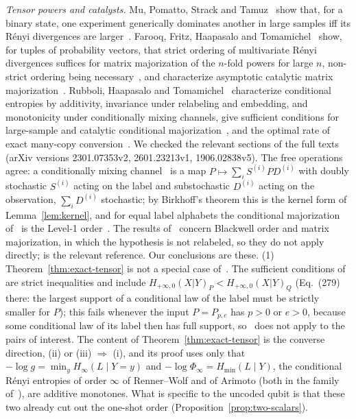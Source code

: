 \emph{Tensor powers and catalysts.} Mu, Pomatto, Strack and Tamuz~\cite{MPST} show that, for a binary state, one experiment generically dominates another in large samples iff its R\'enyi divergences are larger~\cite[Thm.~1]{MPST}. Farooq, Fritz, Haapasalo and Tomamichel~\cite{FFHT} show, for tuples of probability vectors, that strict ordering of multivariate R\'enyi divergences suffices for matrix majorization of the $n$-fold powers for large $n$, non-strict ordering being necessary~\cite[Thm.~19]{FFHT}, and characterize asymptotic catalytic matrix majorization~\cite[Thm.~22]{FFHT}. Rubboli, Haapasalo and Tomamichel~\cite{RHT} characterize conditional entropies by additivity, invariance under relabeling and embedding, and monotonicity under conditionally mixing channels, give sufficient conditions for large-sample and catalytic conditional majorization~\cite[Thm.~6.3]{RHT}, and the optimal rate of exact many-copy conversion~\cite[Thm.~8.1]{RHT}.
We checked the relevant sections of the full texts (arXiv versions 2301.07353v2, 2601.23213v1, 1906.02838v5). The free operations agree: a conditionally mixing channel~\cite[Def.~2.7]{RHT} is a map $P\mapsto\sum_iS^{(i)}PD^{(i)}$ with doubly stochastic $S^{(i)}$ acting on the label and substochastic $D^{(i)}$ acting on the observation, $\sum_iD^{(i)}$ stochastic; by Birkhoff's theorem this is the kernel form of Lemma~\ref{lem:kernel}, and for equal label alphabets the conditional majorization of~\cite[Def.~2.9]{RHT} is the Level-1 order~\cite[Remark~2.10]{RHT}. The results of~\cite{MPST,FFHT} concern Blackwell order and matrix majorization, in which the hypothesis is not relabeled, so they do not apply directly; \cite{RHT} is the relevant reference. Our conclusions are these.
(1) Theorem~\ref{thm:exact-tensor} is not a special case of~\cite{MPST,FFHT,RHT}. The sufficient conditions of~\cite[Thm.~6.3]{RHT} are strict inequalities and include $H_{+\infty,0}(X|Y)_P<H_{+\infty,0}(X|Y)_Q$ (Eq.~(279) there: the largest support of a conditional law of the label must be strictly smaller for $P$); this fails whenever the input $P=P_{p,e}$ has $p>0$ or $e>0$, because some conditional law of its label then has full support, so~\cite[Thm.~6.3]{RHT} does not apply to the pairs of interest. The content of Theorem~\ref{thm:exact-tensor} is the converse direction, (ii) or (iii) $\Rightarrow$ (i), and its proof uses only that $-\log g=\min_yH_\infty(L\mid Y=y)$ and $-\log\Phi_\infty=H_{\min}(L\mid Y)$, the conditional R\'enyi entropies of order $\infty$ of Renner--Wolf and of Arimoto (both in the family of~\cite[Sec.~7C]{RHT}), are additive monotones. What is specific to the uncoded qubit is that these two already cut out the one-shot order (Proposition~\ref{prop:two-scalars}).
